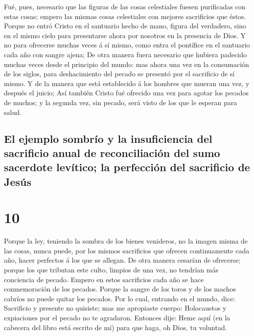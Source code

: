  Fué, pues, necesario que las figuras de las cosas
celestiales fuesen purificadas con estas cosas; empero las mismas cosas
celestiales con mejores sacrificios que éstos.  Porque no
entró Cristo en el santuario hecho de mano, figura del verdadero, sino
en el mismo cielo para presentarse ahora por nosotros en la presencia de
Dios.  Y no para ofrecerse muchas veces á sí mismo, como
entra el pontífice en el santuario cada año con sangre ajena;
 De otra manera fuera necesario que hubiera padecido
muchas veces desde el principio del mundo: mas ahora una vez en la
consumación de los siglos, para deshacimiento del pecado se presentó por
el sacrificio de sí mismo.  Y de la manera que está
establecido á los hombres que mueran una vez, y después el juicio;
 Así también Cristo fué ofrecido una vez para agotar los
pecados de muchos; y la segunda vez, sin pecado, será visto de los que
le esperan para salud.

\hypertarget{el-ejemplo-sombruxedo-y-la-insuficiencia-del-sacrificio-anual-de-reconciliaciuxf3n-del-sumo-sacerdote-levuxedtico-la-perfecciuxf3n-del-sacrificio-de-jesuxfas}{%
\subsection{El ejemplo sombrío y la insuficiencia del sacrificio anual
de reconciliación del sumo sacerdote levítico; la perfección del
sacrificio de
Jesús}\label{el-ejemplo-sombruxedo-y-la-insuficiencia-del-sacrificio-anual-de-reconciliaciuxf3n-del-sumo-sacerdote-levuxedtico-la-perfecciuxf3n-del-sacrificio-de-jesuxfas}}

\hypertarget{section-9}{%
\section{10}\label{section-9}}

 Porque la ley, teniendo la sombra de los bienes
venideros, no la imagen misma de las cosas, nunca puede, por los mismos
sacrificios que ofrecen continuamente cada año, hacer perfectos á los
que se allegan.  De otra manera cesarían de ofrecerse;
porque los que tributan este culto, limpios de una vez, no tendrían más
conciencia de pecado.  Empero en estos sacrificios cada
año se hace conmemoración de los pecados.  Porque la
sangre de los toros y de los machos cabríos no puede quitar los pecados.
 Por lo cual, entrando en el mundo, dice: Sacrificio y
presente no quisiste; mas me apropiaste cuerpo: 
Holocaustos y expiaciones por el pecado no te agradaron. 
Entonces dije: Heme aquí (en la cabecera del libro está escrito de mí)
para que haga, oh Dios, tu voluntad.


